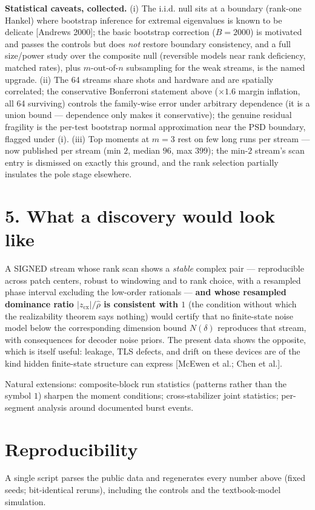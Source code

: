 \documentclass[11pt]{article}
\begin{document}
\textbf{Statistical caveats, collected.}  (i) The i.i.d. null sits at a boundary (rank-one Hankel) where bootstrap inference for extremal eigenvalues is known to be delicate [Andrews 2000]; the basic bootstrap correction ($B = 2000$) is motivated and passes the controls but does \emph{not} restore boundary consistency, and a full size/power study over the composite null (reversible models near rank deficiency, matched rates), plus $m$-out-of-$n$ subsampling for the weak streams, is the named upgrade.  (ii) The 64 streams share shots and hardware and are spatially correlated; the conservative Bonferroni statement above ($\times 1.6$ margin inflation, all 64 surviving) controls the family-wise error under arbitrary dependence (it is a union bound — dependence only makes it conservative); the genuine residual fragility is the per-test bootstrap normal approximation near the PSD boundary, flagged under (i).  (iii) Top moments at $m = 3$ rest on few long runs per stream — now published per stream (min $2$, median $96$, max $399$); the min-$2$ stream's scan entry is dismissed on exactly this ground, and the rank selection partially insulates the pole stage elsewhere.

\section*{5. What a discovery would look like}
A SIGNED stream whose rank scan shows a \emph{stable} complex pair — reproducible across patch centers, robust to windowing and to rank choice, with a resampled phase interval excluding the low-order rationals — \textbf{and whose resampled dominance ratio $|z_{\mathrm{cx}}|/\hat\rho$ is consistent with $1$} (the condition without which the realizability theorem says nothing) would certify that no finite-state noise model below the corresponding dimension bound $N(\delta)$ reproduces that stream, with consequences for decoder noise priors.  The present data shows the opposite, which is itself useful: leakage, TLS defects, and drift on these devices are of the kind hidden finite-state structure can express [McEwen et al.; Chen et al.].

Natural extensions: composite-block run statistics (patterns rather than the symbol $1$) sharpen the moment conditions; cross-stabilizer joint statistics; per-segment analysis around documented burst events.

\section*{Reproducibility}
A single script parses the public data and regenerates every number above (fixed seeds; bit-identical reruns), including the controls and the textbook-model simulation.
\end{document}
